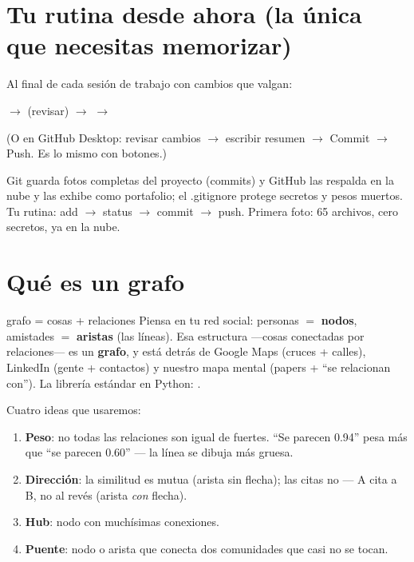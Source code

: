 \documentclass[11pt,a4paper]{article}
\begin{document}
\section{Tu rutina desde ahora (la única que necesitas memorizar)}

Al final de cada sesión de trabajo con cambios que valgan:
\begin{center}
 \quad$\rightarrow$\quad {} (revisar) \quad$\rightarrow$\quad
{} \quad$\rightarrow$\quad {}
\end{center}
(O en GitHub Desktop: revisar cambios $\rightarrow$ escribir resumen $\rightarrow$ Commit
$\rightarrow$ Push. Es lo mismo con botones.)

\begin{resumen}
Git guarda fotos completas del proyecto (commits) y GitHub las respalda en la nube y las
exhibe como portafolio; el .gitignore protege secretos y pesos muertos. Tu rutina: add
$\rightarrow$ status $\rightarrow$ commit $\rightarrow$ push. Primera foto: 65 archivos,
cero secretos, ya en la nube.
\end{resumen}
\clearpage
{}
{}

\section{Qué es un grafo}

\begin{concepto}{grafo = cosas + relaciones}
Piensa en tu red social: personas $=$ \textbf{nodos}, amistades $=$ \textbf{aristas} (las
líneas). Esa estructura —cosas conectadas por relaciones— es un \textbf{grafo}, y está detrás
de Google Maps (cruces + calles), LinkedIn (gente + contactos) y nuestro mapa mental
(papers + ``se relacionan con''). La librería estándar en Python: .
\end{concepto}

Cuatro ideas que usaremos:
\begin{enumerate}
  \item \textbf{Peso}: no todas las relaciones son igual de fuertes. ``Se parecen 0.94'' pesa
        más que ``se parecen 0.60'' — la línea se dibuja más gruesa.
  \item \textbf{Dirección}: la similitud es mutua (arista sin flecha); las citas no — A cita
        a B, no al revés (arista \emph{con} flecha).
  \item \textbf{Hub}: nodo con muchísimas conexiones.
  \item \textbf{Puente}: nodo o arista que conecta dos comunidades que casi no se tocan.
\end{enumerate}
\end{document}
